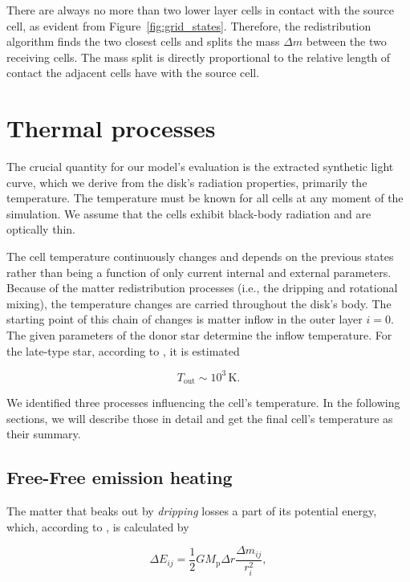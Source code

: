     There are always no more than two lower layer cells in contact with the source cell, as evident from Figure~\ref{fig:grid_states}. Therefore, the redistribution algorithm finds the two closest cells and splits the mass $\Delta m$ between the two receiving cells. The mass split is directly proportional to the relative length of contact the adjacent cells have with the source cell.

\section{Thermal processes}
\label{sec:thermal_processes}
    The crucial quantity for our model's evaluation is the extracted synthetic light curve, which we derive from the disk's radiation properties, primarily the temperature. The temperature must be known for all cells at any moment of the simulation. We assume that the cells exhibit black-body radiation and are optically thin. 

    The cell temperature continuously changes and depends on the previous states rather than being a function of only current internal and external parameters. Because of the matter redistribution processes (i.e., the dripping and rotational mixing), the temperature changes are carried throughout the disk's body. The starting point of this chain of changes is matter inflow in the outer layer $i = 0$. The given parameters of the donor star determine the inflow temperature. For the late-type star, according to \citep{allen1973}, it is estimated

    \begin{equation}
    T_{\mathrm{out}} \sim 10^3\, \mathrm{K}.
    \end{equation}

    We identified three processes influencing the cell's temperature. In the following sections, we will describe those in detail and get the final cell's temperature as their summary. 

\subsection{Free-Free emission heating}
    The matter that beaks out by \emph{dripping} losses a part of its potential energy, which, according to \citep{yonehara1997}, is calculated by 

    \begin{equation}
    \Delta E_{ij} = \frac{1}{2} G M_{\mathrm{p}} \Delta r \frac{\Delta m_{ij}}{r_i^2},
    \label{eq:e_pot}
    \end{equation}

